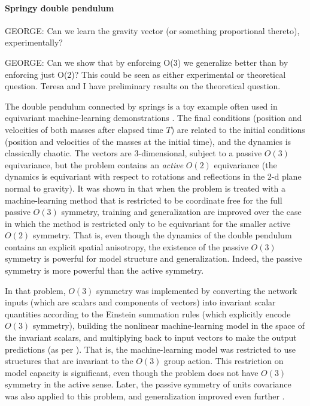 \documentclass{article}
\theoremstyle{plain}
\theoremstyle{definition}
\theoremstyle{remark}
\begin{document}
\paragraph{Springy double pendulum}

GEORGE: Can we learn the gravity vector (or something proportional thereto), experimentally?

GEORGE: Can we show that by enforcing O(3) we generalize better than by enforcing just O(2)? This could be seen as either experimental or theoretical question. Teresa and I have preliminary results on the theoretical question.

The double pendulum connected by springs is a toy example often used in equivariant machine-learning demonstrations \cite{finzi2021practical,yao2021simple}. 
The final conditions (position and velocities of both masses after elapsed time $T$) are related to the initial conditions (position and velocities of the masses at the initial time), and the dynamics is classically chaotic.
The vectors are 3-dimensional, subject to a passive $O(3)$ equivariance, but the problem contains an \emph{active} $O(2)$ equivariance (the dynamics is equivariant with respect to rotations and reflections in the 2-d plane normal to gravity).
It was shown in \cite{yao2021simple} that when the problem is treated with a machine-learning method that is restricted to be coordinate free for the full passive $O(3)$ symmetry, training and generalization are improved over the case in which the method is restricted only to be equivariant for the smaller active $O(2)$ symmetry.
That is, even though the dynamics of the double pendulum contains an explicit spatial anisotropy, the existence of the passive $O(3)$ symmetry is powerful for model structure and generalization.
Indeed, the passive symmetry is more powerful than the active symmetry.

In that problem, $O(3)$ symmetry was implemented by converting the network inputs (which are scalars and components of vectors) into invariant scalar quantities according to the Einstein summation rules (which explicitly encode $O(3)$ symmetry), building the nonlinear machine-learning model in the space of the invariant scalars, and multiplying back to input vectors to make the output predictions (as per \citealt{villar2021scalars}).
That is, the machine-learning model was restricted to use structures that are invariant to the $O(3)$ group action.
This restriction on model capacity is significant, even though the problem does not have $O(3)$ symmetry in the active sense.
Later, the passive symmetry of units covariance was also applied to this problem, and generalization improved even further \cite{villar2022dimensionless}.
\end{document}
